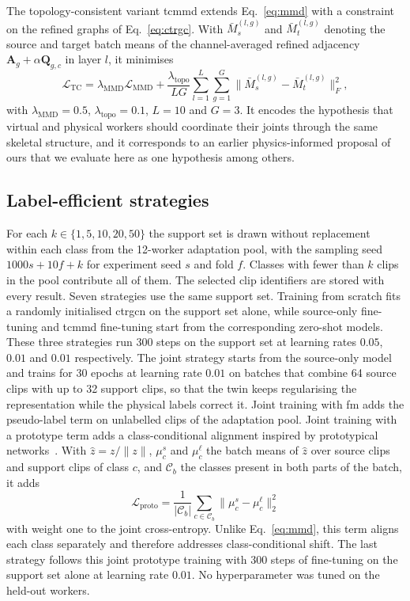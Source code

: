 \documentclass[pdflatex,sn-mathphys-num]{sn-jnl}
\begin{document}
The topology-consistent variant \ac{tcmmd} extends Eq.~\ref{eq:mmd} with a
constraint on the refined graphs of Eq.~\ref{eq:ctrgc}. With
$\bar{M}^{(l,g)}_s$ and $\bar{M}^{(l,g)}_t$ denoting the source and target
batch means of the channel-averaged refined adjacency
$\mathbf{A}_g+\alpha\mathbf{Q}_{g,c}$ in layer $l$, it minimises
\begin{equation}
  \mathcal{L}_{\mathrm{TC}}=\lambda_{\mathrm{MMD}}\mathcal{L}_{\mathrm{MMD}}
  +\frac{\lambda_{\mathrm{topo}}}{LG}\sum_{l=1}^{L}\sum_{g=1}^{G}
  \bigl\|\bar{M}^{(l,g)}_s-\bar{M}^{(l,g)}_t\bigr\|_F^2,
  \label{eq:tc}
\end{equation}
with $\lambda_{\mathrm{MMD}}=0.5$, $\lambda_{\mathrm{topo}}=0.1$, $L=10$ and
$G=3$. It encodes the hypothesis that virtual and physical workers should
coordinate their joints through the same skeletal structure, and it corresponds
to an earlier physics-informed proposal of ours that we evaluate here as one
hypothesis among others.

\subsection{Label-efficient strategies}

For each $k\in\{1,5,10,20,50\}$ the support set is drawn without replacement
within each class from the 12-worker adaptation pool, with the sampling seed
$1000s+10f+k$ for experiment seed $s$ and fold $f$. Classes with fewer than $k$
clips in the pool contribute all of them. The selected clip identifiers are
stored with every result. Seven strategies use the same support set. Training
from scratch fits a randomly initialised \ac{ctrgcn} on the support set alone,
while source-only fine-tuning and \ac{tcmmd} fine-tuning start from the
corresponding zero-shot models. These three strategies run 300 steps on the
support set at learning rates $0.05$, $0.01$ and $0.01$ respectively. The
joint strategy starts from the source-only model and trains for 30 epochs at
learning rate $0.01$ on batches that combine 64 source clips with up to 32
support clips, so that the twin keeps regularising the representation while
the physical labels correct it. Joint training with \ac{fm} adds the
pseudo-label term on unlabelled clips of the adaptation pool. Joint training
with a prototype term adds a class-conditional alignment inspired by
prototypical networks~\cite{snell2017prototypical}. With $\hat{z}=z/\|z\|$,
$\mu_c^s$ and $\mu_c^\ell$ the batch means of $\hat{z}$ over source clips and
support clips of class $c$, and $\mathcal{C}_b$ the classes present in both
parts of the batch, it adds
\begin{equation}
  \mathcal{L}_{\mathrm{proto}}=\frac{1}{|\mathcal{C}_b|}\sum_{c\in\mathcal{C}_b}
  \bigl\|\mu_c^s-\mu_c^\ell\bigr\|_2^2
  \label{eq:proto}
\end{equation}
with weight one to the joint cross-entropy. Unlike Eq.~\ref{eq:mmd}, this term
aligns each class separately and therefore addresses class-conditional shift.
The last strategy follows this joint prototype training with 300 steps of
fine-tuning on the support set alone at learning rate $0.01$. No
hyperparameter was tuned on the held-out workers.
\end{document}
